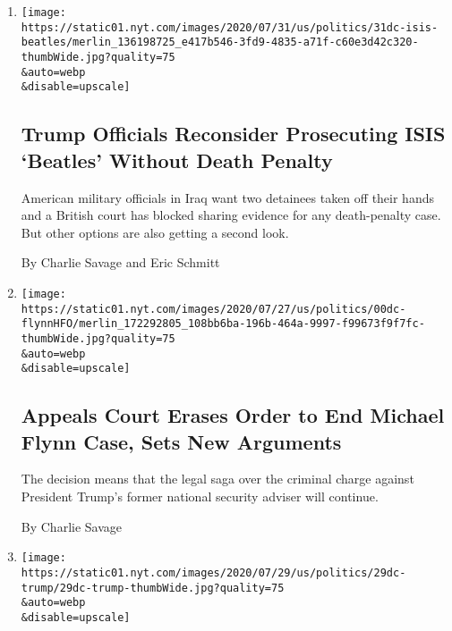 \begin{enumerate}
\def\labelenumi{\arabic{enumi}.}
\item
  \href{/2020/07/31/world/middleeast/isis-beatles-hostages.html}{}

  \texttt{[image: https://static01.nyt.com/images/2020/07/31/us/politics/31dc-isis-beatles/merlin\_136198725\_e417b546-3fd9-4835-a71f-c60e3d42c320-thumbWide.jpg?quality=75\\\&auto=webp\\\&disable=upscale]}

  \hypertarget{trump-officials-reconsider-prosecuting-isis-beatles-without-death-penalty}{%
  \subsection{Trump Officials Reconsider Prosecuting ISIS `Beatles'
  Without Death
  Penalty}\label{trump-officials-reconsider-prosecuting-isis-beatles-without-death-penalty}}

  American military officials in Iraq want two detainees taken off their
  hands and a British court has blocked sharing evidence for any
  death-penalty case. But other options are also getting a second look.

  By Charlie Savage and Eric Schmitt
\item
  \href{/2020/07/30/us/politics/michael-flynn-appeals-court.html}{}

  \texttt{[image: https://static01.nyt.com/images/2020/07/27/us/politics/00dc-flynnHFO/merlin\_172292805\_108bb6ba-196b-464a-9997-f99673f9f7fc-thumbWide.jpg?quality=75\\\&auto=webp\\\&disable=upscale]}

  \hypertarget{appeals-court-erases-order-to-end-michael-flynn-case-sets-new-arguments}{%
  \subsection{Appeals Court Erases Order to End Michael Flynn Case, Sets
  New
  Arguments}\label{appeals-court-erases-order-to-end-michael-flynn-case-sets-new-arguments}}

  The decision means that the legal saga over the criminal charge
  against President Trump's former national security adviser will
  continue.

  By Charlie Savage
\item
  \href{/2020/07/29/us/politics/trump-putin-bounties.html}{}

  \texttt{[image: https://static01.nyt.com/images/2020/07/29/us/politics/29dc-trump/29dc-trump-thumbWide.jpg?quality=75\\\&auto=webp\\\&disable=upscale]}


\end{enumerate}
